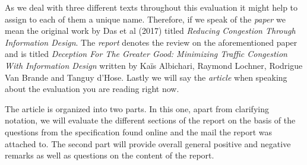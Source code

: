 \documentclass[../review.tex]{subfiles}
\begin{document}
As we deal with three different texts throughout this evaluation it might help to assign to each of them a unique name. Therefore, if we speak of the  \textit{paper} we mean the original work by Das et al (2017) titled \textit{Reducing Congestion Through Information Design}. The \textit{report} denotes the review on the aforementioned paper and is titled \textit{Deception For The Greater Good: Minimizing Traffic Congestion With Information Design} written by Ka\"{i}s Albichari, Raymond Lochner, Rodrigue Van Brande and Tanguy d'Hose. Lastly we will say the \textit{article} when speaking about the evaluation you are reading right now.

The article is organized into two parts. In this one, apart from clarifying notation, we will evaluate the different sections of the report on the basis of the questions from the specification found online and the mail the report was attached to. The second part will provide overall general positive and negative remarks as well as questions on the content of the report.
\end{document}
